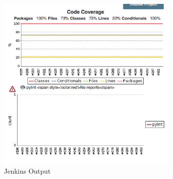 

\begin{figure}[!h]
	\caption{Jenkins Output}
	\centering
	\includegraphics[width=0.8\textwidth]{images/jenkins_Output1.png}
\end{figure}
